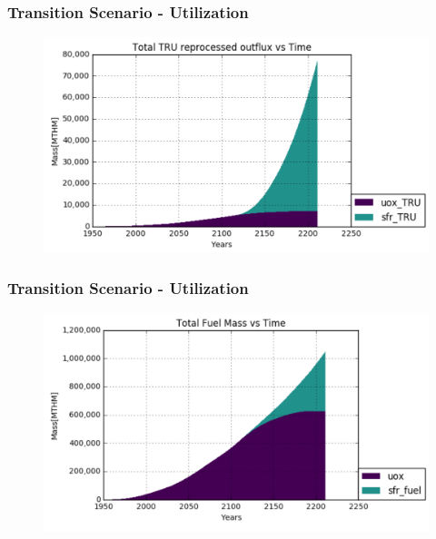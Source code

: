\begin{frame}
\frametitle{Transition Scenario - Utilization}
\begin{figure}
	\includegraphics[width=\linewidth]{images/truutil}
\end{figure}
\end{frame}

\begin{frame}
\frametitle{Transition Scenario - Utilization}
\begin{figure}
	\includegraphics[width=\linewidth]{images/fuelmass}
\end{figure}
\end{frame}